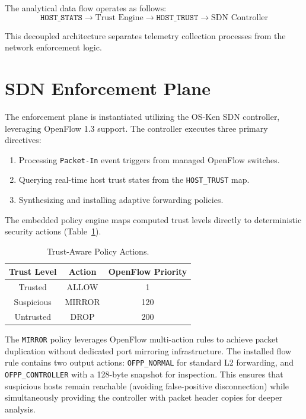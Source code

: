 \documentclass[conference]{IEEEtran}
\begin{document}
The analytical data flow operates as follows:
\begin{equation}
\texttt{HOST\_STATS} \rightarrow \text{Trust Engine} \rightarrow \texttt{HOST\_TRUST} \rightarrow \text{SDN Controller}
\end{equation}

This decoupled architecture separates telemetry collection processes from the network enforcement logic.


\section{SDN Enforcement Plane}

The enforcement plane is instantiated utilizing the OS-Ken SDN controller, leveraging OpenFlow 1.3 support. The controller executes three primary directives:
\begin{enumerate}
\item Processing \texttt{Packet-In} event triggers from managed OpenFlow switches.
\item Querying real-time host trust states from the \texttt{HOST\_TRUST} map.
\item Synthesizing and installing adaptive forwarding policies.
\end{enumerate}

The embedded policy engine maps computed trust levels directly to deterministic security actions (Table~\ref{tab:actions}).

\begin{table}[h]
\centering
\caption{Trust-Aware Policy Actions.}
\label{tab:actions}
\begin{tabular}{ccc}
\toprule
Trust Level & Action & OpenFlow Priority \\
\midrule
Trusted & ALLOW & 1 \\
Suspicious & MIRROR & 120 \\
Untrusted & DROP & 200 \\
\bottomrule
\end{tabular}
\end{table}

The \texttt{MIRROR} policy leverages OpenFlow multi-action rules to achieve packet duplication without dedicated port mirroring infrastructure. The installed flow rule contains two output actions: \texttt{OFPP\_NORMAL} for standard L2 forwarding, and \texttt{OFPP\_CONTROLLER} with a 128-byte snapshot for inspection. This ensures that suspicious hosts remain reachable (avoiding false-positive disconnection) while simultaneously providing the controller with packet header copies for deeper analysis.
\end{document}
